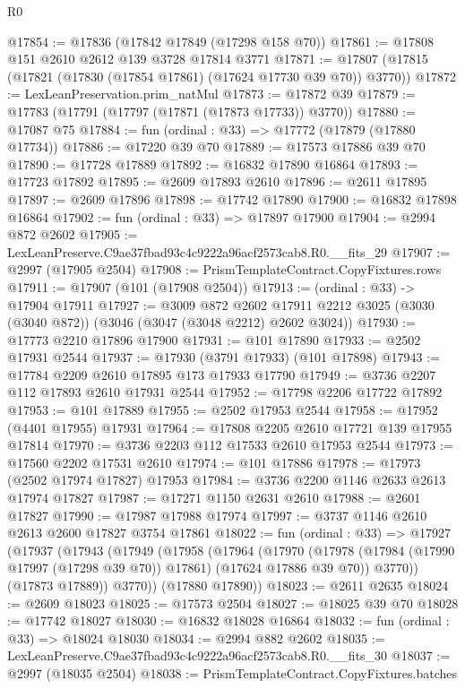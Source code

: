 \begin{lexlean}{R0}
\begin{coremodule}
@17854 := @17836 (@17842 @17849 (@17298 @158 @70))
@17861 := @17808 @151 @2610 @2612 @139 @3728 @17814 @3771
@17871 := @17807 (@17815 (@17821 (@17830 (@17854 @17861) (@17624 @17730 @39 @70)) @3770))
@17872 := LexLeanPreservation.prim_natMul
@17873 := @17872 @39
@17879 := @17783 (@17791 (@17797 (@17871 (@17873 @17733)) @3770))
@17880 := @17087 @75
@17884 := fun (ordinal : @33) => @17772 (@17879 (@17880 @17734))
@17886 := @17220 @39 @70
@17889 := @17573 @17886 @39 @70
@17890 := @17728 @17889
@17892 := @16832 @17890 @16864
@17893 := @17723 @17892
@17895 := @2609 @17893 @2610
@17896 := @2611 @17895
@17897 := @2609 @17896
@17898 := @17742 @17890
@17900 := @16832 @17898 @16864
@17902 := fun (ordinal : @33) => @17897 @17900
@17904 := @2994 @872 @2602
@17905 := LexLeanPreserve.C9ae37fbad93c4c9222a96acf2573cab8.R0.__fits_29
@17907 := @2997 (@17905 @2504)
@17908 := PrismTemplateContract.CopyFixtures.rows
@17911 := @17907 (@101 (@17908 @2504))
@17913 := (ordinal : @33) -> @17904 @17911
@17927 := @3009
    @872
    @2602
    @17911
    @2212
    @3025
    (@3030 (@3040 @872))
    (@3046 (@3047 (@3048 @2212) @2602 @3024))
@17930 := @17773 @2210 @17896 @17900
@17931 := @101 @17890
@17933 := @2502 @17931 @2544
@17937 := @17930 (@3791 @17933) (@101 @17898)
@17943 := @17784 @2209 @2610 @17895 @173 @17933 @17790
@17949 := @3736 @2207 @112 @17893 @2610 @17931 @2544
@17952 := @17798 @2206 @17722 @17892
@17953 := @101 @17889
@17955 := @2502 @17953 @2544
@17958 := @17952 (@4401 @17955) @17931
@17964 := @17808 @2205 @2610 @17721 @139 @17955 @17814
@17970 := @3736 @2203 @112 @17533 @2610 @17953 @2544
@17973 := @17560 @2202 @17531 @2610
@17974 := @101 @17886
@17978 := @17973 (@2502 @17974 @17827) @17953
@17984 := @3736 @2200 @1146 @2633 @2613 @17974 @17827
@17987 := @17271 @1150 @2631 @2610
@17988 := @2601 @17827
@17990 := @17987 @17988 @17974
@17997 := @3737 @1146 @2610 @2613 @2600 @17827 @3754 @17861
@18022 := fun (ordinal : @33) =>
  @17927
    (@17937
      (@17943
        (@17949
          (@17958
            (@17964
              (@17970
                (@17978 (@17984 (@17990 @17997 (@17298 @39 @70)) @17861) (@17624 @17886 @39 @70))
                @3770))
            (@17873 @17889))
          @3770))
      (@17880 @17890))
@18023 := @2611 @2635
@18024 := @2609 @18023
@18025 := @17573 @2504
@18027 := @18025 @39 @70
@18028 := @17742 @18027
@18030 := @16832 @18028 @16864
@18032 := fun (ordinal : @33) => @18024 @18030
@18034 := @2994 @882 @2602
@18035 := LexLeanPreserve.C9ae37fbad93c4c9222a96acf2573cab8.R0.__fits_30
@18037 := @2997 (@18035 @2504)
@18038 := PrismTemplateContract.CopyFixtures.batches

\end{coremodule}
\end{lexlean}
